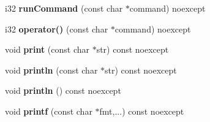 \begin{DoxyCompactItemize}
i32 {\bfseries run\+Command} (const char $\ast$command) noexcept
\item 
\mbox{\label{class_console_handler_a7fb997c4c6fe4f8a4ca3ef95d690d113}} 
i32 {\bfseries operator()} (const char $\ast$command) noexcept
\item 
\mbox{\label{class_console_handler_aac9857174a0cf56f6411ebde2140c895}} 
void {\bfseries print} (const char $\ast$str) const noexcept
\item 
\mbox{\label{class_console_handler_a62d78c52cf397430c0d12cb2fe118247}} 
void {\bfseries println} (const char $\ast$str) const noexcept
\item 
\mbox{\label{class_console_handler_a458f915012f0576a2350342b51c4dadd}} 
void {\bfseries println} () const noexcept
\item 
\mbox{\label{class_console_handler_a79c6b16e1d160cde8c63dacd76c54af1}} 
void {\bfseries printf} (const char $\ast$fmt,...) const noexcept
\end{DoxyCompactItemize}
